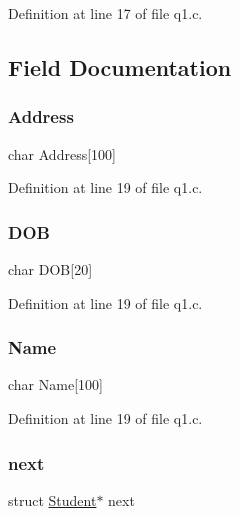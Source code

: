 Definition at line 17 of file q1.\+c.



\subsection{Field Documentation}
\mbox{\label{struct_student_ac8b69a306e0bda4dbd3ff7195b193577}} 
\subsubsection{\texorpdfstring{Address}{Address}}
{\footnotesize\ttfamily char Address\mbox{[}100\mbox{]}}



Definition at line 19 of file q1.\+c.

\mbox{\label{struct_student_ac7f4f37722482a16f12dc314d0d1360f}} 
\subsubsection{\texorpdfstring{D\+OB}{DOB}}
{\footnotesize\ttfamily char D\+OB\mbox{[}20\mbox{]}}



Definition at line 19 of file q1.\+c.

\mbox{\label{struct_student_a6b7a07c8ee9c9f38664df19619d58228}} 
\subsubsection{\texorpdfstring{Name}{Name}}
{\footnotesize\ttfamily char Name\mbox{[}100\mbox{]}}



Definition at line 19 of file q1.\+c.

\mbox{\label{struct_student_a6a280e6c00fedbc058905a9b06e2bc91}} 
\subsubsection{\texorpdfstring{next}{next}}
{\footnotesize\ttfamily struct \hyperlink{struct_student}{Student}$\ast$ next}




